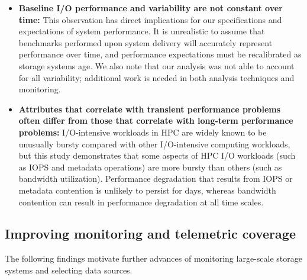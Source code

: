 \begin{itemize}[leftmargin=*]

\item \textbf{Baseline I/O performance and variability are not constant over
time:}
This observation has direct implications for our specifications and expectations of system performance.
It is unrealistic to assume that benchmarks performed upon system delivery
will accurately represent performance over time, and performance
expectations must be recalibrated as storage systems age.  We also note that
our analysis was not able to account for all variability; additional work is
needed in both analysis techniques and monitoring.

\item \textbf{Attributes that correlate with transient performance problems often differ from those that correlate with long-term performance problems:}
I/O-intensive workloads in HPC are widely known to be unusually bursty compared with other I/O-intensive computing workloads, but this study demonstrates that some aspects of HPC I/O workloads (such as IOPS and metadata operations) are more bursty than others (such as bandwidth utilization).
Performance degradation that results from IOPS or metadata contention is unlikely to persist for days, whereas bandwidth contention can result in performance degradation at all time scales.

\end{itemize}


\subsection{Improving monitoring and telemetric coverage}

The following findings motivate further advances of monitoring large-scale storage systems and selecting data sources.


